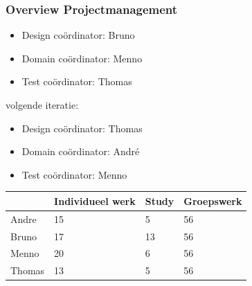\documentclass{beamer}
\begin{document}
\begin{frame}
\frametitle{Overview Projectmanagement}


\begin{itemize}
    \item Design co\"ordinator: Bruno
    \item Domain co\"ordinator: Menno
    \item Test co\"ordinator: Thomas
\end{itemize}

volgende iteratie:

\begin{itemize}
    \item Design co\"ordinator: Thomas
    \item Domain co\"ordinator: Andr\'{e}
    \item Test co\"ordinator: Menno
\end{itemize}

\begin{table}[h]
\begin{tabular}{|l|l|l|l|}
\hline
       & Individueel werk & Study & Groepswerk \\ \hline
Andre  &     15             &    5   &   56         \\ \hline
Bruno  &      17            &   13    &   56         \\ \hline
Menno  &          20        &     6  &       56     \\ \hline
Thomas &            13      &     5  &        56    \\ \hline
\end{tabular}
\end{table}

\end{frame}
\end{document}
